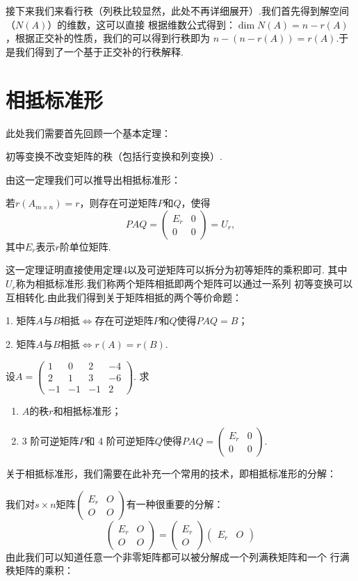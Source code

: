 接下来我们来看行秩（列秩比较显然，此处不再详细展开）.我们首先得到解空间（$N(A)$）的维数，这可以直接
根据维数公式得到：$\dim N(A) =n-r(A)$，根据正交补的性质，我们的可以得到行秩即为
$n-(n-r(A))=r(A)$.于是我们得到了一个基于正交补的行秩解释.

\section{相抵标准形}
此处我们需要首先回顾一个基本定理：
\begin{theorem}
    初等变换不改变矩阵的秩（包括行变换和列变换）.
\end{theorem}
由这一定理我们可以推导出相抵标准形：
\begin{theorem}
    若$r(A_{m \times n})=r$，则存在可逆矩阵$P$和$Q$，使得
    $$PAQ=\begin{pmatrix}
        E_r & 0 \\ 0 & 0
    \end{pmatrix}=U_r,$$
    其中$E_r$表示$r$阶单位矩阵.
\end{theorem}
这一定理证明直接使用定理4以及可逆矩阵可以拆分为初等矩阵的乘积即可.
其中$U_r$称为相抵标准形.我们称两个矩阵相抵即两个矩阵可以通过一系列
初等变换可以互相转化.由此我们得到关于矩阵相抵的两个等价命题：

1. 矩阵$A$与$B$相抵$\iff$存在可逆矩阵$P$和$Q$使得$PAQ=B$；

2. 矩阵$A$与$B$相抵$\iff r(A)=r(B)$.

\begin{example}
    设$A=\begin{pmatrix}
        1 & 0 & 2 & -4 \\ 2 & 1 & 3 & -6 \\ -1 & -1 & -1 & 2
    \end{pmatrix}$. 求
    \begin{enumerate}
        \item $A$的秩$r$和相抵标准形；

        \item 3 阶可逆矩阵$P$和 4 阶可逆矩阵$Q$使得$PAQ=\begin{pmatrix}
            E_r & 0 \\ 0 & 0
        \end{pmatrix}$.
    \end{enumerate}
\end{example}

关于相抵标准形，我们需要在此补充一个常用的技术，即相抵标准形的分解：

我们对$s \times n$矩阵$\begin{pmatrix}
    E_r & O \\ O & O
\end{pmatrix}$有一种很重要的分解：
\[\begin{pmatrix}
    E_r & O \\ O & O
\end{pmatrix}=\begin{pmatrix}
    E_r \\ O
\end{pmatrix}\begin{pmatrix}
    E_r & O
\end{pmatrix}\]
由此我们可以知道任意一个非零矩阵都可以被分解成一个列满秩矩阵和一个
行满秩矩阵的乘积：


